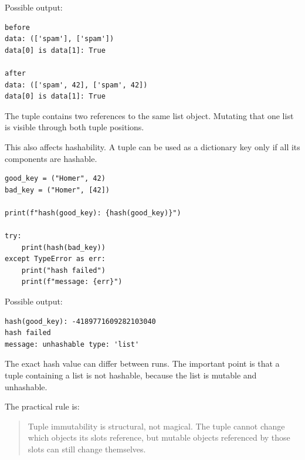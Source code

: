 Possible output:

\begin{verbatim}
before
data: (['spam'], ['spam'])
data[0] is data[1]: True

after
data: (['spam', 42], ['spam', 42])
data[0] is data[1]: True
\end{verbatim}

The tuple contains two references to the same list object. Mutating that one list is visible through both tuple positions.

This also affects hashability. A tuple can be used as a dictionary key only if all its components are hashable.

\begin{verbatim}
good_key = ("Homer", 42)
bad_key = ("Homer", [42])

print(f"hash(good_key): {hash(good_key)}")

try:
    print(hash(bad_key))
except TypeError as err:
    print("hash failed")
    print(f"message: {err}")
\end{verbatim}

Possible output:

\begin{verbatim}
hash(good_key): -4189771609282103040
hash failed
message: unhashable type: 'list'
\end{verbatim}

The exact hash value can differ between runs. The important point is that a tuple containing a list is not hashable, because the list is mutable and unhashable.

The practical rule is:

\begin{quote}
Tuple immutability is structural, not magical. The tuple cannot change which objects its slots reference, but mutable objects referenced by those slots can still change themselves.
\end{quote}